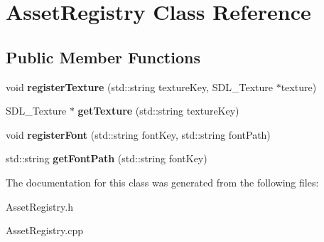 \hypertarget{class_asset_registry}{}\section{Asset\+Registry Class Reference}
\label{class_asset_registry}
\subsection*{Public Member Functions}
\begin{DoxyCompactItemize}
\item 
\mbox{\label{class_asset_registry_accc7c589d1e865b170316252fec647c5}} 
void {\bfseries register\+Texture} (std\+::string texture\+Key, S\+D\+L\+\_\+\+Texture $\ast$texture)
\item 
\mbox{\label{class_asset_registry_a805d034c3b3a40b472637ecffd4afce1}} 
S\+D\+L\+\_\+\+Texture $\ast$ {\bfseries get\+Texture} (std\+::string texture\+Key)
\item 
\mbox{\label{class_asset_registry_ab79e000ec0d63d5fb94b271121ac3008}} 
void {\bfseries register\+Font} (std\+::string font\+Key, std\+::string font\+Path)
\item 
\mbox{\label{class_asset_registry_a179a1ad2e9da6d20c4550125fc746478}} 
std\+::string {\bfseries get\+Font\+Path} (std\+::string font\+Key)
\end{DoxyCompactItemize}


The documentation for this class was generated from the following files\+:\begin{DoxyCompactItemize}
\item 
Asset\+Registry.\+h\item 
Asset\+Registry.\+cpp\end{DoxyCompactItemize}
